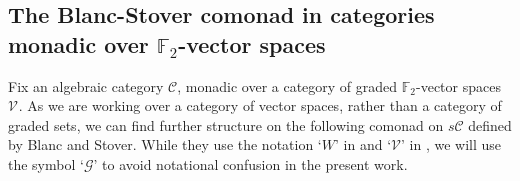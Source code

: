 \documentclass[11pt]{amsart} \renewcommand{\baselinestretch}{1.4}
\theoremstyle{plain}
\theoremstyle{definition}
\renewcommand{\to}{\longrightarrow}
\newcommand{\scrG}{\mathscr{G}}
\newcommand{\scrV}{\mathscr{V}}
\newcommand{\calV}{\mathcal{V}}
\newcommand{\calc}{\mathcal{C}}
\newcommand{\vect}[2]{\calV^{#1}_{#2}}
\newcommand{\BSW}{{\scrG}}
\newcommand{\F}{\mathbb{F}}
\newcommand{\complexes}{\mathrm{ch}_+}
\newcommand{\Ftwo}{\F_2}
\begin{document}
\begin{Composite functor spectral sequences}
\subsection{The Blanc-Stover comonad in categories monadic over $\Ftwo $-vector spaces}\label{The Blanc-Stover comonad sect}
Fix an algebraic category $\calc$, monadic over a category of graded $\Ftwo $-vector spaces $\vect{}{}$. %
As we are working over a category of vector spaces, rather than a category of graded sets, we can find further structure on  the following comonad on $s\calc$ defined by Blanc and Stover. While they  use the notation `$W$' in \cite{Blanc_Stover-Groth_SS.pdf} and `$\scrV$' in \cite{StoverVanKampen.pdf}, we will use the symbol `$\BSW$' to avoid notational confusion in the present work.

\end{Composite functor spectral sequences}
\end{document}
